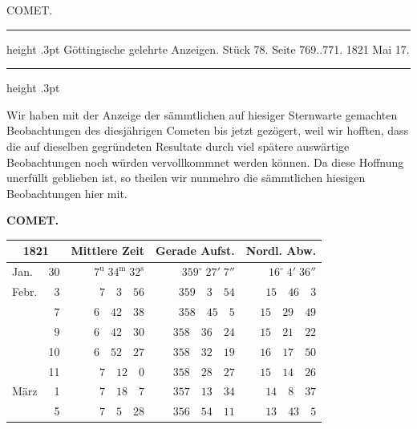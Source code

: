\par\bigskip
{}
\hypertarget{native-442-part-lower}{}
\begin{center}
{\large COMET.}
\end{center}
\begin{center}
\parbox{.76\linewidth}{%
\centering\small
\hrule height .3pt\relax\vspace{2.5pt}
Göttingische gelehrte Anzeigen. Stück 78. Seite 769..771. 1821 Mai 17.\par
\vspace{2.5pt}\hrule height .3pt\relax
}
\end{center}

Wir haben mit der Anzeige der sämmtlichen auf hiesiger Sternwarte gemachten Beobachtungen
des diesjährigen Cometen bis jetzt gezögert, weil wir hofften, dass die auf dieselben gegründeten Resultate durch viel spätere auswärtige Beobachtungen noch würden vervollkommnet werden können.
Da diese Hoffnung unerfüllt geblieben ist, so theilen wir nunmehro die sämmtlichen hiesigen Beobachtungen hier mit.

\clearpage
\thispagestyle{empty}
\noindent{}%
%
\parbox[t]{\dimexpr\linewidth-24mm\relax}{\centering\footnotesize\bfseries COMET.\par}%
\makebox[12mm][r]{}\par\nobreak\medskip
{}
\begin{center}
\begin{tabular}{lr|r|r|r}
\multicolumn{2}{c|}{1821} & Mittlere Zeit & Gerade Aufst. & Nordl. Abw. \\
\hline
Jan. & 30 & $7^{\mathrm{u}}\;34^{\mathrm{m}}\;32^{\mathrm{s}}$ & $359^\circ\;27'\;7''$ & $16^\circ\;4'\;36''$ \\
Febr. & 3 & $7\quad3\quad56$ & $359\quad3\quad54$ & $15\quad46\quad3$ \\
& 7 & $6\quad42\quad38$ & $358\quad45\quad5$ & $15\quad29\quad49$ \\
& 9 & $6\quad42\quad30$ & $358\quad36\quad24$ & $15\quad21\quad22$ \\
& 10 & $6\quad52\quad27$ & $358\quad32\quad19$ & $16\quad17\quad50$ \\
& 11 & $7\quad12\quad0$ & $358\quad28\quad27$ & $15\quad14\quad26$ \\
März & 1 & $7\quad18\quad7$ & $357\quad13\quad34$ & $14\quad8\quad37$ \\
& 5 & $7\quad5\quad28$ & $356\quad54\quad11$ & $13\quad43\quad5$ \\
\end{tabular}
\end{center}

